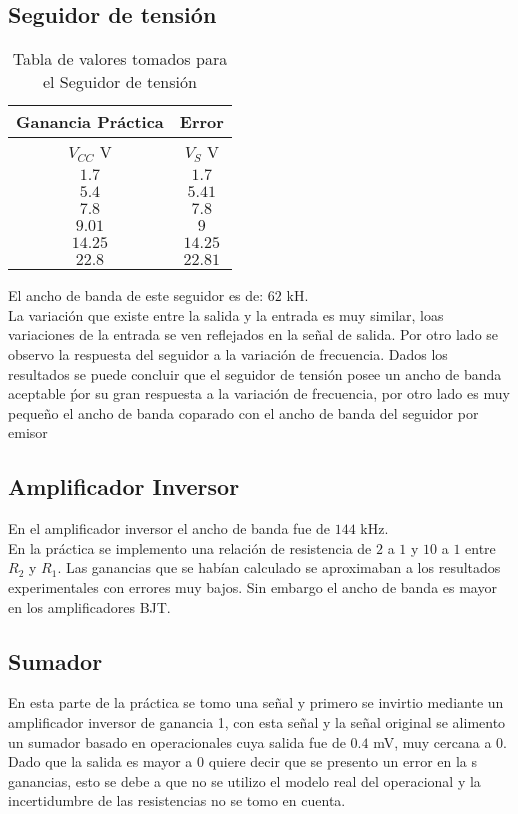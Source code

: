 \documentclass[11pt,graphicx,caption,rotating]{article}
\begin{document}
\subsection{Seguidor de tensión}
\begin{table}[H]
	\centering
\begin{tabular}[c]{|c|c|} \hline
 Ganancia Práctica & Error \\ \hline
$V_{CC}$ V & $V_S$ V \\ \hline
$1.7$ & $1.7$ \\ \hline
$5.4$ & $5.41$ \\ \hline
$7.8$ & $7.8$ \\ \hline
$9.01$ & $9$ \\ \hline
$14.25$ & $14.25$ \\ \hline
$22.8$ & $22.81$ \\ \hline
\end{tabular}
	\caption{Tabla de valores tomados para el Seguidor de tensión}
	\label{tab20}
\end{table}
\noindent
El ancho de banda de este seguidor es de: $62$ kH.\\
La variación que existe entre la salida y la entrada es muy similar, loas variaciones de la entrada se ven reflejados en la señal de salida. Por otro lado se observo la respuesta del seguidor a la variación de frecuencia. Dados los resultados se puede concluir que el seguidor de tensión posee un ancho de banda aceptable ṕor su gran respuesta a la variación de frecuencia, por otro lado es muy pequeño el ancho de banda coparado con el ancho de banda del seguidor por emisor


\subsection{Amplificador Inversor}
\noindent
En el amplificador inversor el ancho de banda fue de $144$ kHz.\\
En la práctica se implemento una relación de resistencia de $2$ a $1$ y $10$ a $1$ entre $R_2$ y $R_1$. Las ganancias que se habían calculado se aproximaban a los resultados experimentales con errores muy bajos. Sin embargo el ancho de banda es mayor en los amplificadores BJT.

\subsection{Sumador}
\noindent
En esta parte de la práctica se tomo una señal y primero se invirtio mediante un amplificador inversor de ganancia 1, con esta señal y la señal original se alimento un sumador basado en operacionales cuya salida fue de $0.4$ mV, muy cercana a $0$. Dado que la salida es mayor a $0$ quiere decir que se presento un error en la s ganancias, esto se debe a que no se utilizo el modelo real del operacional y la incertidumbre de las resistencias no se tomo en cuenta.
\end{document}
